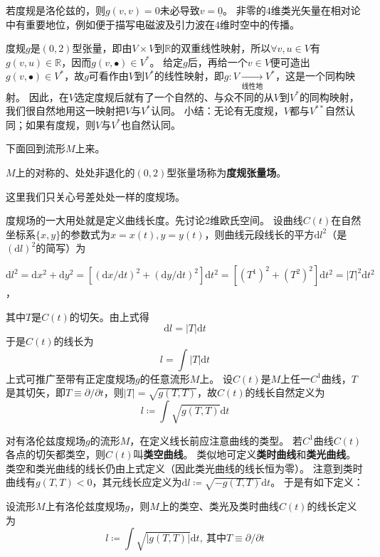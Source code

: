 \begin{note}
若度规是洛伦兹的，则$g(v, v) = 0$未必导致$v = \underline{0}$。
非零的$4$维类光矢量在相对论中有重要地位，例如便于描写电磁波及引力波在$4$维时空中的传播。
\end{note}

度规$g$是$(0, 2)$型张量，即由$V \times V$到$\mathbb{R}$的双重线性映射，所以$\forall v, u \in V$有$g(v, u) \in \mathbb{R}$，因而$g(v, \bullet) \in V^*$。
给定$g$后，再给一个$v \in V$便可造出$g(v, \bullet) \in V^*$，故$g$可看作由$V$到$V^*$的线性映射，即$g \colon V \xrightarrow[\text{线性地}]{} V^*$，这是一个同构映射。
因此，在$V$选定度规后就有了一个自然的、与众不同的从$V$到$V^*$的同构映射，我们很自然地用这一映射把$V$与$V^*$认同。
小结：无论有无度规，$V$都与$V^{**}$自然认同；如果有度规，则$V$与$V^*$也自然认同。

下面回到流形$M$上来。

\begin{definition}
$M$上的对称的、处处非退化的$(0, 2)$型张量场称为\textbf{度规张量场}。
\end{definition}

\begin{note}
这里我们只关心号差处处一样的度规场。
\end{note}

度规场的一大用处就是定义曲线长度。先讨论$2$维欧氏空间。
设曲线$C(t)$在自然坐标系$\{x, y\}$的参数式为$x = x(t), y = y(t)$，则曲线元段线长的平方$\mathrm{d}l^2$（是$(\mathrm{d}l)^2$的简写）为

$\mathrm{d}l^2 = \mathrm{d}x^2 + \mathrm{d}y^2 = [(\mathrm{d}x / \mathrm{d}t)^2 + (\mathrm{d}y / \mathrm{d}t)^2]\mathrm{d}t^2 = [(T^1)^2 + (T^2)^2]\mathrm{d}t^2 = |T|^2\mathrm{d}t^2$，

其中$T$是$C(t)$的切矢。由上式得
$$\mathrm{d}l = |T|\mathrm{d}t$$
于是$C(t)$的线长为
$$l = \int |T| \mathrm{d}t$$
上式可推广至带有正定度规场$g$的任意流形$M$上。
设$C(t)$是$M$上任一$C^1$曲线，$T$是其切矢，即$T \equiv \partial / \partial t$，则$|T| = \sqrt{g(T, T)}$，故$C(t)$的线长自然定义为
$$l \coloneq \int \sqrt{g(T, T)}\mathrm{d}t$$

对有洛伦兹度规场$g$的流形$M$，在定义线长前应注意曲线的类型。
若$C^1$曲线$C(t)$各点的切矢都类空，则$C(t)$叫\textbf{类空曲线}。
类似地可定义\textbf{类时曲线}和\textbf{类光曲线}。
类空和类光曲线的线长仍由上式定义（因此类光曲线的线长恒为零）。
注意到类时曲线有$g(T, T) < 0$，其元线长应定义为$\mathrm{d}l \coloneq \sqrt{-g(T, T)}\mathrm{d}t$。
于是有如下定义：

\begin{definition}
设流形$M$上有洛伦兹度规场$g$，则$M$上的类空、类光及类时曲线$C(t)$的线长定义为
$$l \coloneq \int\sqrt{|g(T, T)|}\mathrm{d}t, ~ \text{其中}T \equiv \partial / \partial t$$
\end{definition}

